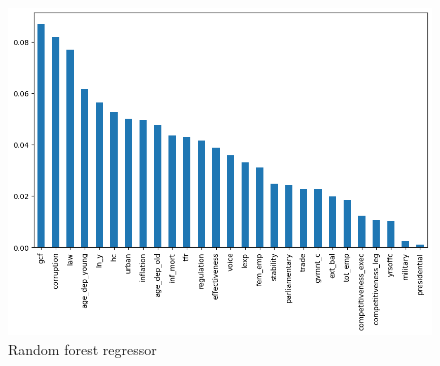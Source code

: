 \documentclass[10pt,leqno]{article}
\begin{document}
\begin{figure}  [h!]
\begin{center}
\caption{Random forest regressor}
\includegraphics[scale=0.4]{RFRegressor_RF3.png}
\end{center}
\end{figure}  
\end{document}
